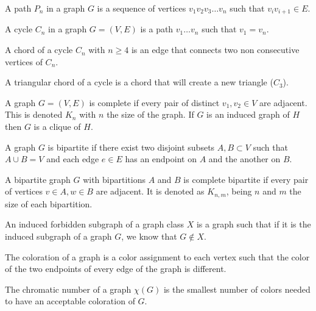 \begin{defn}
  A path $P_n$ in a graph $G$ is a sequence of vertices $v_1v_2v_3\dots v_n$ such
  that $v_iv_{i+1} \in E$.
\end{defn}

\begin{defn}
  A cycle $C_n$ in a graph $G = (V,E)$ is a path $v_1\dots v_n$ such that $v_1 = v_n$.
\end{defn}

\begin{defn}
  A chord of a cycle $C_n$ with $n \geq 4 $ is an edge that connects two non consecutive vertices
  of $C_n$.
\end{defn}

\begin{defn}
  A triangular chord of a cycle is a chord that will create a new triangle ($C_3$).
\end{defn}


\begin{defn}
  A graph $G = (V,E)$ is complete if every pair of distinct $v_1,v_2 \in V$ are
  adjacent. This is denoted $K_n$ with $n$ the size of the graph. If $G$ is an
  induced graph of $H$ then $G$ is a clique of $H$.
\end{defn}

\begin{defn}
  A graph $G$ is bipartite if there exist two disjoint subsets $A,B \subset V$ such
  that $A\cup B = V$ and each edge $e\in E$ has an endpoint on $A$ and the
  another on $B$.
\end{defn}

\begin{defn}
  A bipartite graph $G$ with bipartitions $A$ and $B$ is complete bipartite if
  every pair of vertices $v\in A, w\in B$ are adjacent. It is denoted as $K_{n,m}$,
  being $n$ and $m$ the size of each bipartition.
\end{defn}

\begin{defn}
  An induced forbidden subgraph of a graph class $X$ is a graph such that if it is the induced
  subgraph of a graph $G$, we know that $G \notin X$.
\end{defn}

The coloration of a graph is a color assignment to each vertex such that the color
of the two endpoints of every edge of the graph is different.

\begin{defn}
  The chromatic number of a graph $\chi(G)$ is the smallest number of colors needed to
  have an acceptable coloration of $G$.
\end{defn}

